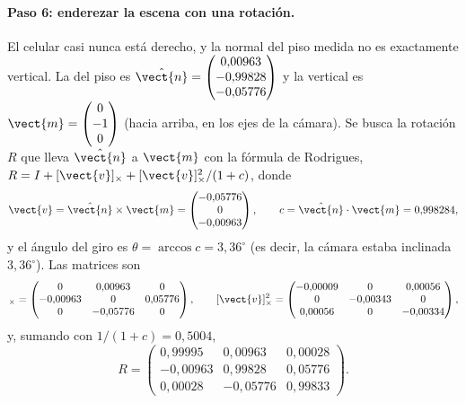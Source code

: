 \paragraph{Paso 6: enderezar la escena con una rotación.} El celular casi nunca está derecho, y la normal del piso medida no es exactamente vertical. La del piso es
$\hat{\vect{n}}=\begin{pmatrix} 0{,}00963 \\ -0{,}99828 \\ -0{,}05776 \end{pmatrix}$ y la vertical es $\vect{m}=\begin{pmatrix} 0 \\ -1 \\ 0 \end{pmatrix}$ (hacia arriba, en los ejes de la cámara). Se busca la rotación $R$ que lleva $\hat{\vect{n}}$ a $\vect{m}$ con la
fórmula de Rodrigues, $R=I+[\vect{v}]_\times+[\vect{v}]_\times^{2}/(1+c)$, donde
\begin{equation}
\vect{v}=\hat{\vect{n}}\times\vect{m}=\begin{pmatrix} -0{,}05776 \\ 0 \\ -0{,}00963 \end{pmatrix},\qquad c=\hat{\vect{n}}\cdot\vect{m}=0{,}998284,
\end{equation}
y el ángulo del giro es $\theta=\arccos c=3{,}36^\circ$ (es decir, la cámara estaba inclinada $3{,}36^\circ$). Las matrices son
\begin{equation}
[\vect{v}]_\times=\begin{pmatrix} 0 & 0{,}00963 & 0 \\ -0{,}00963 & 0 & 0{,}05776 \\ 0 & -0{,}05776 & 0 \end{pmatrix},\qquad [\vect{v}]_\times^{2}=\begin{pmatrix} -0{,}00009 & 0 & 0{,}00056 \\ 0 & -0{,}00343 & 0 \\ 0{,}00056 & 0 & -0{,}00334 \end{pmatrix} ,
\end{equation}
y, sumando con $1/(1+c)=0{,}5004$,
\begin{equation}
R=\begin{pmatrix} 0{,}99995 & 0{,}00963 & 0{,}00028 \\ -0{,}00963 & 0{,}99828 & 0{,}05776 \\ 0{,}00028 & -0{,}05776 & 0{,}99833 \end{pmatrix} .
\end{equation}
